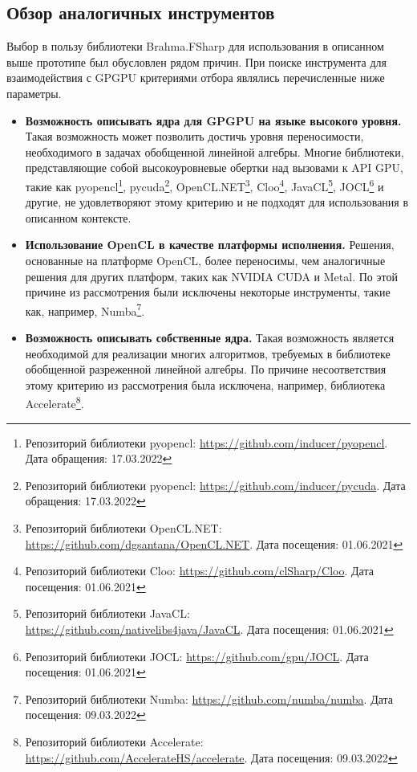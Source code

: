 
\label{sec:relatedworks}

\subsection{Обзор аналогичных инструментов}
Выбор в пользу библиотеки Brahma.FSharp для использования в описанном выше прототипе был обусловлен рядом причин. При поиске инструмента для взаимодействия с GPGPU критериями отбора являлись перечисленные ниже параметры.
\begin{itemize}
    \item \textbf{Возможность описывать ядра для GPGPU на языке высокого уровня.} Такая возможность может позволить достичь уровня переносимости, необходимого в задачах обобщенной линейной алгебры. Многие библиотеки, представляющие собой высокоуровневые обертки над вызовами к API GPU, такие как pyopencl\footnote{Репозиторий библиотеки pyopencl: \url{https://github.com/inducer/pyopencl}. Дата обращения: 17.03.2022}, pycuda\footnote{Репозиторий библиотеки pyopencl: \url{https://github.com/inducer/pycuda}. Дата обращения: 17.03.2022}, OpenCL.NET\footnote{Репозиторий библиотеки OpenCL.NET: \url{https://github.com/dgsantana/OpenCL.NET}. Дата посещения: 01.06.2021}, Cloo\footnote{Репозиторий библиотеки Cloo: \url{https://github.com/clSharp/Cloo}. Дата посещения: 01.06.2021}, JavaCL\footnote{Репозиторий библиотеки JavaCL: \url{https://github.com/nativelibs4java/JavaCL}. Дата посещения: 01.06.2021}, JOCL\footnote{Репозиторий библиотеки JOCL: \url{https://github.com/gpu/JOCL}. Дата посещения: 01.06.2021} и другие, не удовлетворяют этому критерию и не подходят для использования в описанном контексте.
    \item \textbf{Использование OpenCL в качестве платформы исполнения.} Решения, основанные на платформе OpenCL, более переносимы, чем аналогичные решения для других платформ, таких как NVIDIA CUDA и Metal. По этой причине из рассмотрения были исключены некоторые инструменты, такие как, например, Numba\footnote{Репозиторий библиотеки Numba: \url{https://github.com/numba/numba}. Дата посещения: 09.03.2022}.
    \item \textbf{Возможность описывать собственные ядра.} Такая возможность является необходимой для реализации многих алгоритмов, требуемых в библиотеке обобщенной разреженной линейной алгебры. По причине несоответствия этому критерию из рассмотрения была исключена, например, библиотека Accelerate\footnote{Репозиторий библиотеки Accelerate: \url{https://github.com/AccelerateHS/accelerate}. Дата посещения: 09.03.2022}.

\end{itemize}
